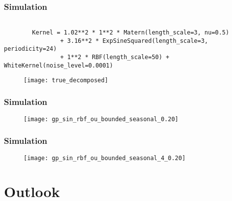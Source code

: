 \documentclass[
	8pt, %
]{beamer}
\begin{document}
\begin{frame}[fragile]
	\frametitle{Simulation}

	\begin{verbatim}

		Kernel = 1.02**2 * 1**2 * Matern(length_scale=3, nu=0.5)
				+ 3.16**2 * ExpSineSquared(length_scale=3, periodicity=24)
				+ 1**2 * RBF(length_scale=50) + WhiteKernel(noise_level=0.0001)

	\end{verbatim}

	\begin{figure}
			\texttt{[image: true\_decomposed]}
	\end{figure}


\end{frame}

\begin{frame}
	\frametitle{Simulation}


	\begin{figure}
			\texttt{[image: gp\_sin\_rbf\_ou\_bounded\_seasonal\_0.20]}
	\end{figure}

\end{frame}



\begin{frame}
	\frametitle{Simulation}

	\begin{figure}
			\texttt{[image: gp\_sin\_rbf\_ou\_bounded\_seasonal\_4\_0.20]}
	\end{figure}

\end{frame}



\section{Outlook}%
\end{document}
